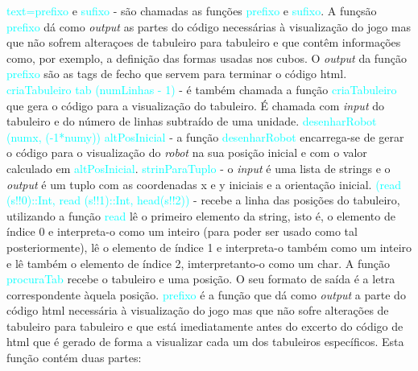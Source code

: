 \documentclass[12pt,a4paper]{article}
\begin{document}
{\newline \indent \textcolor{cyan}{text=prefixo} e \textcolor{cyan}{sufixo} - são chamadas as fun\c{c}ões \textcolor{cyan}{prefixo} e \textcolor{cyan}{sufixo}. A fun\c{c}são \textcolor{cyan}{prefixo} dá como \textit{output} as partes do código necessárias à  visualiza\c{c}ão do jogo mas que não sofrem altera\c{c}oes de tabuleiro para tabuleiro e que contêm informa\c{c}ões como, por exemplo, a defini\c{c}ão das formas usadas nos cubos. O \textit{output} da fun\c{c}ão \textcolor{cyan}{prefixo} são as tags de fecho que servem para terminar o código html.
\newline \indent \textcolor{cyan}{criaTabuleiro tab (numLinhas - 1)} - é também chamada a fun\c{c}ão \textcolor{cyan}{criaTabuleiro} que gera o código para a visualiza\c{c}ão do tabuleiro. É chamada com \textit{input} do tabuleiro e do número de linhas subtraído de uma unidade.
\newline \indent \textcolor{cyan}{desenharRobot (numx, (-1*numy)) altPosInicial} - a fun\c{c}ão \textcolor{cyan}{desenharRobot} encarrega-se de gerar o código para o visualiza\c{c}ão do \textit{robot} na sua posi\c{c}ão inicial e com o valor calculado em \textcolor{cyan}{altPosInicial}.}
\newline \textsf{ \indent \textcolor{cyan}{strinParaTuplo} - o \textit{input} é uma lista de strings e o \textit{output} é um tuplo com as coordenadas x e y iniciais e a orienta\c{c}ão inicial.
\newline \indent \textcolor{cyan}{(read (s!!0)::Int, read (s!!1)::Int, head(s!!2))} - recebe a linha das posi\c{c}ões do tabuleiro, utilizando a fun\c{c}ão \textcolor{cyan}{read} lê o primeiro elemento da string, isto é, o elemento de índice 0 e interpreta-o como um inteiro (para poder ser usado como tal posteriormente), lê o elemento de índice 1 e interpreta-o também como um inteiro e lê também o elemento de índice 2, imterpretanto-o como um} char. 
\newline \indent \textsf{ A fun\c{c}ão \textcolor{cyan}{procuraTab} recebe o tabuleiro e uma posi\c{c}ão. O seu formato de saída é a letra correspondente àquela posi\c{c}ão.
\newline \indent \textcolor{cyan}{prefixo} é a fun\c{c}ão que dá como \textit{output} a parte do código} html \textsf{necessária à visualiza\c{c}ão do jogo mas que não sofre altera\c{c}ões de tabuleiro para tabuleiro e que está imediatamente antes do excerto do código de} html \textsf{que é gerado de forma a visualizar cada um dos tabuleiros específicos. Esta função contém duas partes:} 
\end{document}
